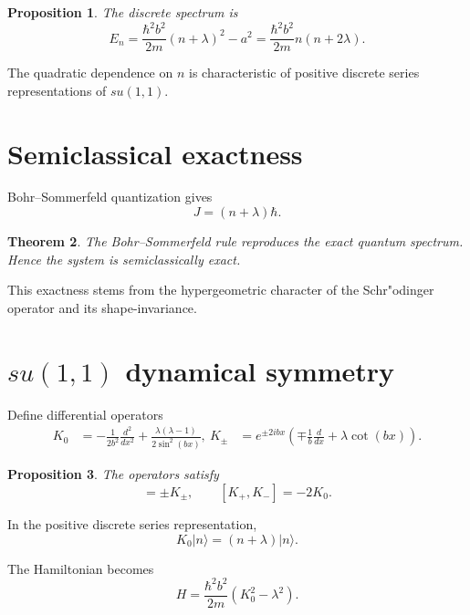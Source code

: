 \documentclass[11pt]{article}
\newtheorem{theorem}{Theorem}[section]
\newtheorem{proposition}[theorem]{Proposition}
\begin{document}
\begin{proposition}
The discrete spectrum is
\begin{equation}
E_n=\frac{\hbar^2 b^2}{2m}(n+\lambda)^2-a^2
=\frac{\hbar^2 b^2}{2m}n(n+2\lambda).
\end{equation}
\end{proposition}

The quadratic dependence on $n$ is characteristic of positive discrete
series representations of $su(1,1)$.

\section{Semiclassical exactness}

Bohr--Sommerfeld quantization gives
\begin{equation}
J=(n+\lambda)\hbar.
\end{equation}

\begin{theorem}
The Bohr--Sommerfeld rule reproduces the exact quantum spectrum.
Hence the system is semiclassically exact.
\end{theorem}

This exactness stems from the hypergeometric character of the
Schr"odinger operator and its shape-invariance.

\section{$su(1,1)$ dynamical symmetry}

Define differential operators
\begin{align}
K_0 &= -\frac{1}{2b^2}\frac{d^2}{dx^2}+\frac{\lambda(\lambda-1)}{2\sin^2(bx)}, \
K_\pm &= e^{\pm 2ibx}
\left(\mp\frac{1}{b}\frac{d}{dx}+\lambda\cot(bx)\right).
\end{align}

\begin{proposition}
The operators satisfy
\begin{equation}
[K_0,K_\pm]=\pm K_\pm,
\qquad
[K_+,K_-]=-2K_0.
\end{equation}
\end{proposition}

In the positive discrete series representation,
\begin{equation}
K_0|n \rangle =(n+\lambda)|n \rangle.
\end{equation}

The Hamiltonian becomes
\begin{equation}
H=\frac{\hbar^2 b^2}{2m}(K_0^2-\lambda^2).
\end{equation}
\end{document}
